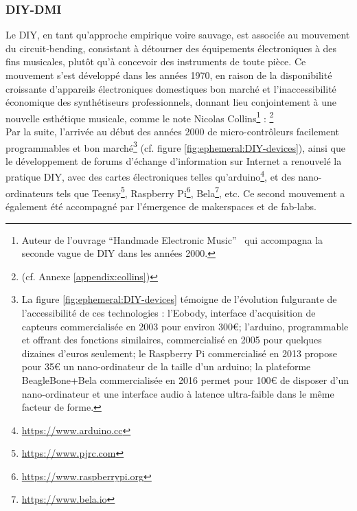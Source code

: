\subsubsection{DIY-DMI}

\noindent Le \gls{DIY}, en tant qu'approche empirique voire sauvage, est associée au mouvement du \gls{circuit-bending}, consistant à détourner des équipements électroniques à des fins musicales, plutôt qu'à concevoir des instruments de toute pièce. Ce mouvement s'est développé dans les années 1970, en raison de la disponibilité croissante d'appareils électroniques domestiques bon marché et l'inaccessibilité économique des synthétiseurs professionnels, donnant lieu conjointement à une nouvelle esthétique musicale, comme le note Nicolas Collins\footnote{Auteur de l'ouvrage ``Handmade Electronic Music''~\cite{collins_handmade_2006} qui accompagna la seconde vague de \gls{DIY} dans les années 2000.} :  \footnote{ (cf. Annexe \ref{appendix:collins})}\\
\indent Par la suite, l'arrivée au début des années 2000 de micro-contrôleurs facilement programmables et bon marché\footnote{La figure \ref{fig:ephemeral:DIY-devices} témoigne de l'évolution fulgurante de l'accessibilité de ces technologies : l'Eobody, interface d'acquisition de capteurs commercialisée en 2003 pour environ 300€; l'arduino, programmable et offrant des fonctions similaires, commercialisé en 2005 pour quelques dizaines d'euros seulement; le Raspberry Pi commercialisé en 2013 propose pour 35€ un nano-ordinateur de la taille d'un arduino; la plateforme BeagleBone+Bela commercialisée en 2016 permet pour 100€ de disposer d'un nano-ordinateur et une interface audio à latence ultra-faible dans le même facteur de forme.} (cf. figure \ref{fig:ephemeral:DIY-devices}), ainsi que le développement de forums d'échange d'information sur Internet a renouvelé la pratique \gls{DIY}, avec des cartes électroniques telles qu'arduino\footnote{\url{https://www.arduino.cc}}, et des nano-ordinateurs tels que Teensy\footnote{\url{https://www.pjrc.com}}, Raspberry Pi\footnote{\url{https://www.raspberrypi.org}}, Bela\footnote{\url{https://www.bela.io}}, etc. Ce second mouvement a également été accompagné par l'émergence de \glspl{makerspace} et de \glspl{fab-lab}.
